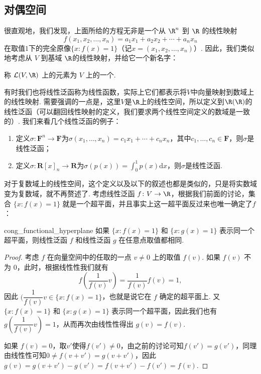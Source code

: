 \subsection{对偶空间}

很直观地，我们发现，上面所给的方程无非是一个从 $\R^n$ 到 $\R$ 的线性映射
\[f(x_1, x_2, \ldots, x_n) = a_1 x_1 + a_2 x_2 + \cdots + a_n x_n\]
在取值$1$下的完全原像$\{x: f(x) = 1\}$（记$x=(x_1,x_2,\ldots,x_n)$）. 因此，我们类似地考虑从 $V$ 到基域 $\R$的线性映射，并给它一个新名字：

\begin{definition}{}{}
    称 $\mathcal{L}(V, \R)$ 上的元素为 $V$ 上的一个.
\end{definition}
有时我们也将线性泛函称为线性函数，实际上它们都表示将$V$中向量映射到数域上的线性映射. 需要强调的一点是，这里$V$是$\R$上的线性空间，所以定义到$\R(\R)$的线性泛函（可以翻回线性映射的定义，我们要求两个线性空间定义的数域是一致的）. 我们来看几个线性泛函的例子：
\begin{enumerate}
    \item 定义$\sigma:\mathbf{F}^n\to\mathbf{F}$为$\sigma(x_1,\ldots,x_n)=c_1x_1+\cdots+c_nx_n$，其中$c_1,\ldots,c_n\in\mathbf{F}$，则$\sigma$是线性泛函；

    \item 定义$\sigma:\mathbf{R}[x]_n\to\mathbf{R}$为$\sigma(p(x))=\displaystyle\int_0^1p(x)\mathrm{d}x$，则$\sigma$是线性泛函.
\end{enumerate}

对于复数域上的线性空间，这个定义以及以下的叙述也都是类似的，只是将实数域变为复数域，就不再赘述了. 考虑线性泛函 $f\colon V \to \R$，根据我们前面的讨论，集合 $\{x: f(x) = 1\}$ 就是一个超平面，并且事实上这一超平面反过来也唯一确定了$f$：

\begin{lemma}{}{cong_functional_hyperplane}
    如果 $\{x: f(x) = 1\}$ 和 $\{x: g(x) = 1\}$ 表示同一个超平面，则线性泛函 $f$ 和线性泛函 $g$ 在任意点取值都相同.
\end{lemma}

\begin{proof}
    考虑 $f$ 在向量空间中的任取的一点 $v \neq 0$ 上的取值 $f(v)$. 如果 $f(v)$ 不为 $0$，此时，根据线性性我们就有
    \[f(\dfrac{1}{f(v)}v)=\dfrac{1}{f(v)}f(v)=1,\]
    因此 $(\dfrac{1}{f(v)}v \in \{x: f(x) = 1\}$，也就是说它在 $f$ 确定的超平面上. 又$\{x: f(x) = 1\}$ 和 $\{x: g(x) = 1\}$ 表示同一个超平面，因此我们也有 $g(\dfrac{1}{f(v)} v) = 1$，从而再次由线性性得出 $g(v) = f(v)$.

    如果 $f(v)=0$，取$v'$使得$f(v')\neq 0$，由之前的讨论可知$f(v')=g(v')$，同理由线性性可知$0\neq f(v+v')=g(v+v')$，因此$g(v)=g(v+v')-g(v')=f(v+v')-f(v')=f(v)$.
\end{proof}

